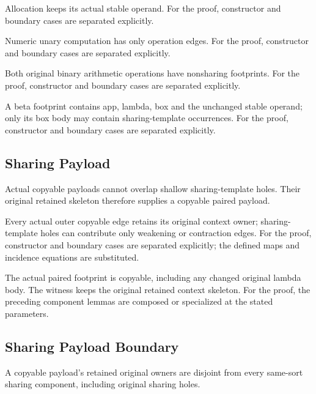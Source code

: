 Allocation keeps its actual stable operand.
For the proof, constructor and boundary cases are separated explicitly.
\par{}

Numeric unary computation has only operation edges.
For the proof, constructor and boundary cases are separated explicitly.
\par{}

Both original binary arithmetic operations have nonsharing footprints.
For the proof, constructor and boundary cases are separated explicitly.
\par{}

A beta footprint contains app, lambda, box and the unchanged stable operand; only its box body may contain sharing-template occurrences.
For the proof, constructor and boundary cases are separated explicitly.
\par{}

\subsection{Sharing Payload}
Actual copyable payloads cannot overlap shallow sharing-template holes. Their original retained skeleton therefore supplies a copyable paired payload.

Every actual outer copyable edge retains its original context owner; sharing-template holes can contribute only weakening or contraction edges.
For the proof, constructor and boundary cases are separated explicitly; the defined maps and incidence equations are substituted.
\par{}

The actual paired footprint is copyable, including any changed original lambda body. The witness keeps the original retained context skeleton.
For the proof, the preceding component lemmas are composed or specialized at the stated parameters.
\par{}

\subsection{Sharing Payload Boundary}
A copyable payload's retained original owners are disjoint from every same-sort sharing component, including original sharing holes.


